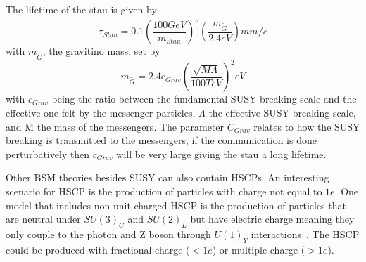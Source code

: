 The lifetime of the stau is given by~\cite{Fairbairn:2006gg}
\begin{equation}
\tau_{Stau} = 0.1 \left(\frac{100 GeV}{m_{Stau}}\right)^5 \left(\frac{m_{\tilde{G}}}{2.4 eV}\right) mm/c
\label{eq:lifetime}
\end{equation}
with $m_{\tilde{G}}$, the gravitino mass, set by
\begin{equation}
m_{\tilde{G}} = 2.4 c_{Grav} \left(\frac{\sqrt{M\Lambda}}{100 TeV}\right)^2 eV
\label{eq:gravmass}
\end{equation}
with $c_{Grav}$ being the ratio between the fundamental SUSY breaking scale and the effective one felt by the messenger particles,
$\Lambda$ the effective SUSY breaking scale, and M the mass of the messengers.
The parameter $C_{Grav}$ relates to how the SUSY breaking is transmitted to the messengers, if the communication is done perturbatively then $c_{Grav}$
will be very large giving the stau a long lifetime.

Other BSM theories besides SUSY can also contain HSCPs.
An interesting scenario for HSCP is the production of particles with charge not equal to $1e$.
One model that includes non-unit charged HSCP is the production of particles that are neutral under $SU(3)_C$ and $SU(2)_L$ 
but have electric charge meaning they only couple to the photon and Z boson through $U(1)_Y$ interactions~\cite{Langacker:2011db}.
The HSCP could be produced with fractional charge ($<1e$) or multiple charge ($>1e$).


